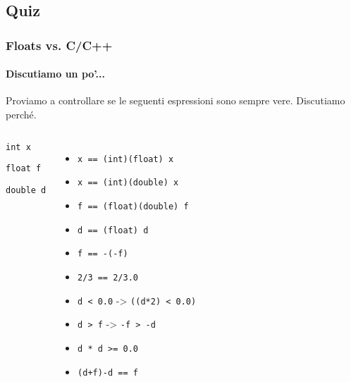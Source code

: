 \documentclass{beamer}
\begin{document}
  \subsection{Quiz}
  \begin{frame}
  	  \frametitle{Floats vs. C/C++}
    \framesubtitle{Discutiamo un po'...}
  	
    Proviamo a controllare se le seguenti espressioni sono sempre vere. Discutiamo perché.
        
    \vspace{1em}
    \begin{columns}
			\begin{center}
				\texttt{int x}
	
			  \texttt{float f}
				
				\texttt{double d}			
			\end{center}						
	    \begin{itemize}
	    		\item \texttt{x == (int)(float) x}
				\item \texttt{x == (int)(double) x}
				\item \texttt{f == (float)(double) f}
				\item \texttt{d == (float) d}
				\item \texttt{f == -(-f)}
				\item \texttt{2/3 == 2/3.0}
				\item \texttt{d < 0.0} -> \texttt{((d*2) < 0.0)}
				\item \texttt{d > f} -> \texttt{-f > -d}
				\item \texttt{d * d >= 0.0}
				\item \texttt{(d+f)-d == f}
	    \end{itemize}
    \end{columns}
  \end{frame}
\end{document}
